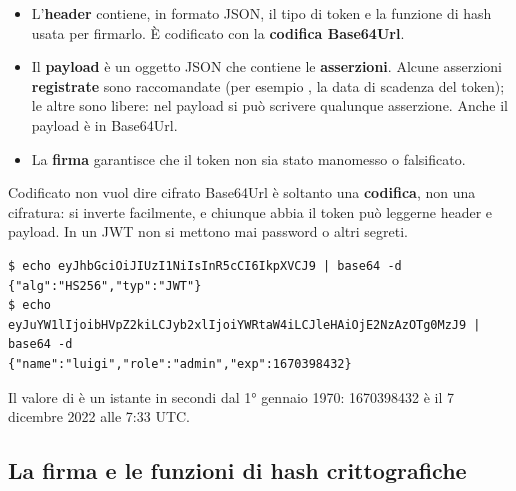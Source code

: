 \begin{center}
\end{center}

\begin{itemize}
  \item L'\textcolor{swblue}{\textbf{header}} contiene, in formato JSON, il tipo di token e la funzione di hash usata per
        firmarlo. È codificato con la \textbf{codifica Base64Url}.
  \item Il \textcolor{sworange!90!black}{\textbf{payload}} è un oggetto JSON che contiene le \textbf{asserzioni}. Alcune
        asserzioni \textbf{registrate} sono raccomandate (per esempio , la data di scadenza del token); le
        altre sono libere: nel payload si può scrivere qualunque asserzione. Anche il payload è in Base64Url.
  \item La \textcolor{swred}{\textbf{firma}} garantisce che il token non sia stato manomesso o falsificato.
\end{itemize}

\begin{warningbox}{{Codificato non vuol dire cifrato}}
  Base64Url è soltanto una \textbf{codifica}, non una cifratura: si inverte facilmente, e chiunque abbia il token può
  leggerne header e payload. In un JWT non si mettono mai password o altri segreti.
  \begin{lstlisting}[style=shell, name=Terminale]
$ echo eyJhbGciOiJIUzI1NiIsInR5cCI6IkpXVCJ9 | base64 -d
{"alg":"HS256","typ":"JWT"}
$ echo eyJuYW1lIjoibHVpZ2kiLCJyb2xlIjoiYWRtaW4iLCJleHAiOjE2NzAzOTg0MzJ9 | base64 -d
{"name":"luigi","role":"admin","exp":1670398432}
\end{lstlisting}
  Il valore di  è un istante in secondi dal 1° gennaio 1970: 1670398432 è il 7 dicembre 2022 alle 7:33 UTC.
\end{warningbox}

\subsection{La firma e le funzioni di hash crittografiche}

